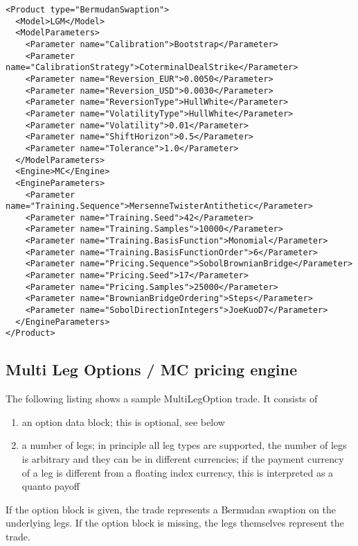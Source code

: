 \documentclass[12pt, a4paper]{article}
\begin{document}
\begin{verbatim}
<Product type="BermudanSwaption">
  <Model>LGM</Model>
  <ModelParameters>
    <Parameter name="Calibration">Bootstrap</Parameter>
    <Parameter name="CalibrationStrategy">CoterminalDealStrike</Parameter>
    <Parameter name="Reversion_EUR">0.0050</Parameter>
    <Parameter name="Reversion_USD">0.0030</Parameter>
    <Parameter name="ReversionType">HullWhite</Parameter>
    <Parameter name="VolatilityType">HullWhite</Parameter>
    <Parameter name="Volatility">0.01</Parameter>
    <Parameter name="ShiftHorizon">0.5</Parameter>
    <Parameter name="Tolerance">1.0</Parameter>
  </ModelParameters>
  <Engine>MC</Engine>
  <EngineParameters>
    <Parameter name="Training.Sequence">MersenneTwisterAntithetic</Parameter>
    <Parameter name="Training.Seed">42</Parameter>
    <Parameter name="Training.Samples">10000</Parameter>
    <Parameter name="Training.BasisFunction">Monomial</Parameter>
    <Parameter name="Training.BasisFunctionOrder">6</Parameter>
    <Parameter name="Pricing.Sequence">SobolBrownianBridge</Parameter>
    <Parameter name="Pricing.Seed">17</Parameter>
    <Parameter name="Pricing.Samples">25000</Parameter>
    <Parameter name="BrownianBridgeOrdering">Steps</Parameter>
    <Parameter name="SobolDirectionIntegers">JoeKuoD7</Parameter>
  </EngineParameters>
</Product>
\end{verbatim}

\subsection{Multi Leg Options / MC pricing engine}

The following listing shows a sample MultiLegOption trade. It consists of

\begin{enumerate}
\item an option data block; this is optional, see below
\item a number of legs; in principle all leg types are supported, the number of legs is arbitrary and they can be in
  different currencies; if the payment currency of a leg is different from a floating index currency, this is
  interpreted as a quanto payoff
\end{enumerate}

If the option block is given, the trade represents a Bermudan swaption on the underlying legs. If the option block is
missing, the legs themselves represent the trade.
\end{document}

